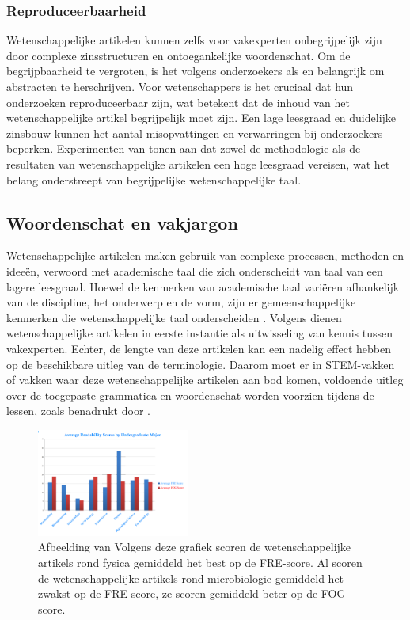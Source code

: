 \subsubsection{Reproduceerbaarheid}
Wetenschappelijke artikelen kunnen zelfs voor vakexperten onbegrijpelijk zijn door complexe zinsstructuren en ontoegankelijke woordenschat. Om de begrijpbaarheid te vergroten, is het volgens onderzoekers als \textcite{Hartley1999} en \textcite{Snow2010} belangrijk om abstracten te herschrijven. Voor wetenschappers is het cruciaal dat hun onderzoeken reproduceerbaar zijn, wat betekent dat de inhoud van het wetenschappelijke artikel begrijpelijk moet zijn. Een lage leesgraad en duidelijke zinsbouw kunnen het aantal misopvattingen en verwarringen bij onderzoekers beperken. Experimenten van \textcite{Hubbard2017} tonen aan dat zowel de methodologie als de resultaten van wetenschappelijke artikelen een hoge leesgraad vereisen, wat het belang onderstreept van begrijpelijke wetenschappelijke taal.

\subsection{Woordenschat en vakjargon}
Wetenschappelijke artikelen maken gebruik van complexe processen, methoden en ideeën, verwoord met academische taal die zich onderscheidt van taal van een lagere leesgraad. Hoewel de kenmerken van academische taal variëren afhankelijk van de discipline, het onderwerp en de vorm, zijn er gemeenschappelijke kenmerken die wetenschappelijke taal onderscheiden \autocite{Ennals2010, Snow2010}. Volgens \textcite{PlavenSigray2017} dienen wetenschappelijke artikelen in eerste instantie als uitwisseling van kennis tussen vakexperten. Echter, de lengte van deze artikelen kan een nadelig effect hebben op de beschikbare uitleg van de terminologie. Daarom moet er in STEM-vakken of vakken waar deze wetenschappelijke artikelen aan bod komen, voldoende uitleg over de toegepaste grammatica en woordenschat worden voorzien tijdens de lessen, zoals benadrukt door \textcite{Snow2010}.

\begin{figure}[H]
	\includegraphics[width=5cm]{img/fre-fog-per-sector.png}
	\caption{Afbeelding van \textcite{Murdos2014} Volgens deze grafiek scoren de wetenschappelijke artikels rond fysica gemiddeld het best op de FRE-score. Al scoren de wetenschappelijke artikels rond microbiologie gemiddeld het zwakst op de FRE-score, ze scoren gemiddeld beter op de FOG-score.}
\end{figure}

